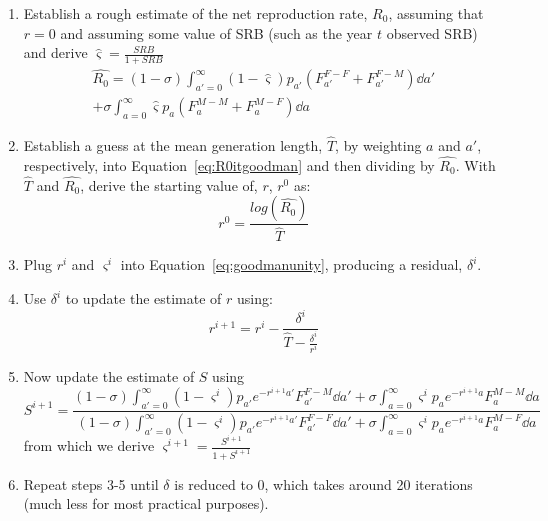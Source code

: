 \begin{enumerate}
  \item Establish a rough estimate of the net reproduction rate, $R_0$, assuming
  that $r = 0$ and assuming some value of SRB (such as the year $t$ observed
  SRB) and derive $\hat{\varsigma} = \frac{SRB}{1 + SRB}$
  \begin{equation}
  \label{eq:R0itgoodman}
  \begin{split}
\widehat{R_0} = (1-\sigma) \int_{a'=0}^\infty (1-\hat{\varsigma})
p_{a'}(F_{a'}^{F-F}+F_{a'}^{F-M}) \dd a' \\ + \sigma  \int_{a=0}^\infty
\hat{\varsigma} p_a(F_a^{M-M}+F_a^{M-F}) \dd a
\end{split}
  \end{equation}
  \item Establish a guess at the mean generation length, $\widehat{T}$, by
  weighting $a$ and $a'$, respectively, into Equation~\eqref{eq:R0itgoodman} and
  then dividing by $\widehat{R_0}$. With $\widehat{T}$ and $\widehat{R_0}$,
  derive the starting value of, $r$, $r^{0}$ as:
  \begin{equation}
  r^{0} = \frac{log(\widehat{R_0})}{\widehat{T}}
  \end{equation}
  \item Plug $r^{i}$ and $\varsigma^i$ into
  Equation~\eqref{eq:goodmanunity}, producing a residual, $\delta^{i}$.
  \item Use $\delta^{i}$ to update the estimate of $r$ using:
   \begin{equation}
  r^{i+1} = r^i - \frac{\delta^i}{\widehat{T} - \frac{\delta^i}{r^i}}
  \end{equation}
  \item Now update the estimate of $S$ using
   \begin{equation}
        S^{i+1} = \frac{(1-\sigma) \int_{a'=0}^\infty
         (1-\varsigma^i)p_{a'}e^{-r^{i+1}a'} F_{a'}^{F-M} \dd a' + 
         \sigma  \int_{a=0}^\infty \varsigma^i p_ae^{-r^{i+1}a} F_a^{M-M} \dd
         a}{ (1-\sigma) \int_{a'=0}^\infty
         (1-\varsigma^i)p_{a'}e^{-r^{i+1}a'} F_{a'}^{F-F} \dd a' + 
         \sigma  \int_{a=0}^\infty \varsigma^i p_ae^{-r^{i+1}a} F_a^{M-F} \dd a}
  \end{equation}
  from which we derive $\varsigma^{i+1} = \frac{S^{i+1}}{1+S^{i+1}}$
  \item Repeat steps 3-5 until $\delta$ is reduced to 0, which takes around 20
  iterations (much less for most practical purposes).
\end{enumerate}

